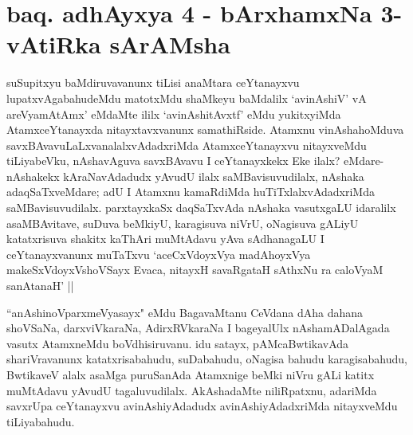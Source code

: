 \section*{baq. adhAyxya 4 - bArxhamxNa 3-vAtiRka sArAMsha}

\begin{artha}%
suSupitxyu baMdiruvavanunx tiLisi anaMtara ceYtanayxvu lupatxvAgabahudeMdu matotxMdu shaMkeyu baMdalilx `avinAshiV' vA areV\s yamAtAmx' eMdaMte ililx `avinAshitAvxtf' eMdu yukitxyiMda AtamxceYtanayxda nitayxtavxvanunx samathiRside. Atamxnu vinAshahoMduva savxBAvavuLaLxvanalalxvAdadxriMda AtamxceYtanayxvu nitayxveMdu tiLiyabeVku, nAshavAguva savxBAvavu I ceYtanayxkekx Eke ilalx? eMdare- nAshakekx kAraNavAdadudx yAvudU ilalx saMBavisuvudilalx, nAshaka adaqSaTxveMdare; adU I Atamxnu kamaRdiMda huTiTxlalxvAdadxriMda saMBavisuvudilalx. parxtayxkaSx daqSaTxvAda nAshaka vasutxgaLU idaralilx asaMBAvitave, suDuva beMkiyU, karagisuva niVrU, oNagisuva gALiyU katatxrisuva shakitx kaThAri muMtAdavu yAva sAdhanagaLU I ceYtanayxvanunx muTaTxvu `aceCxVdoyxV\s ya madAhoyxV\s ya makeSxVdoyxV\s shoVSayx Evaca, nitayxH savaRgataH sAthxNu ra caloV\s yaM sanAtanaH' ||
\end{artha}

\begin{artha}
``anAshinoV\s parxmeVyasayx" eMdu BagavaMtanu CeVdana dAha dahana shoVSaNa, darxviVkaraNa, AdirxRVkaraNa I bageyalUlx nAshamADalAgada vasutx AtamxneMdu boVdhisiruvanu. idu satayx, pAMcaBwtikavAda shariVravanunx katatxrisabahudu, suDabahudu, oNagisa bahudu karagisabahudu, BwtikaveV alalx asaMga puruSanAda Atamxnige beMki niVru gALi katitx muMtAdavu yAvudU tagaluvudilalx. AkAshadaMte niliRpatxnu, adariMda savxrUpa ceYtanayxvu avinAshiyAdadudx avinAshiyAdadxriMda nitayxveMdu tiLiyabahudu. 
\end{artha}


